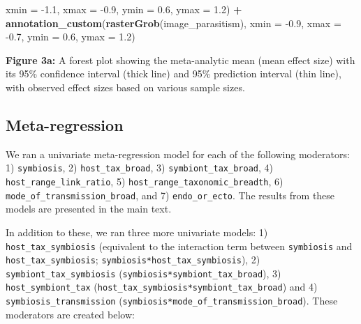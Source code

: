\documentclass[
]{article}
\newenvironment{Shaded}{\begin{snugshade}}{\end{snugshade}}
\newcommand{\DataTypeTok}[1]{\textcolor[rgb]{0.13,0.29,0.53}{#1}}
\newcommand{\FloatTok}[1]{\textcolor[rgb]{0.00,0.00,0.81}{#1}}
\newcommand{\KeywordTok}[1]{\textcolor[rgb]{0.13,0.29,0.53}{\textbf{#1}}}
\newcommand{\NormalTok}[1]{#1}
\newcommand{\OperatorTok}[1]{\textcolor[rgb]{0.81,0.36,0.00}{\textbf{#1}}}
\newcommand{\StringTok}[1]{\textcolor[rgb]{0.31,0.60,0.02}{#1}}
\begin{document}
\begin{Shaded}
\begin{Highlighting}[]
    \DataTypeTok{xmin =} \FloatTok{-1.1}\NormalTok{, }\DataTypeTok{xmax =} \FloatTok{-0.9}\NormalTok{, }\DataTypeTok{ymin =} \FloatTok{0.6}\NormalTok{, }\DataTypeTok{ymax =} \FloatTok{1.2}\NormalTok{) }\OperatorTok{+}\StringTok{ }\KeywordTok{annotation_custom}\NormalTok{(}\KeywordTok{rasterGrob}\NormalTok{(image_parasitism), }
    \DataTypeTok{xmin =} \FloatTok{-0.9}\NormalTok{, }\DataTypeTok{xmax =} \FloatTok{-0.7}\NormalTok{, }\DataTypeTok{ymin =} \FloatTok{0.6}\NormalTok{, }\DataTypeTok{ymax =} \FloatTok{1.2}\NormalTok{)}
\end{Highlighting}
\end{Shaded}

\textbf{Figure 3a:} A forest plot showing the meta-analytic mean (mean
effect size) with its 95\% confidence interval (thick line) and 95\%
prediction interval (thin line), with observed effect sizes based on
various sample sizes.

\hypertarget{meta-regression}{%
\subsection{Meta-regression}\label{meta-regression}}

We ran a univariate meta-regression model for each of the following
moderators: 1) \texttt{symbiosis}, 2) \texttt{host\_tax\_broad}, 3)
\texttt{symbiont\_tax\_broad}, 4) \texttt{host\_range\_link\_ratio}, 5)
\texttt{host\_range\_taxonomic\_breadth}, 6)
\texttt{mode\_of\_transmission\_broad}, and 7) \texttt{endo\_or\_ecto}.
The results from these models are presented in the main text.

In addition to these, we ran three more univariate models: 1)
\texttt{host\_tax\_symbiosis} (equivalent to the interaction term
between \texttt{symbiosis} and \texttt{host\_tax\_symbiosis};
\texttt{symbiosis*host\_tax\_symbiosis}), 2)
\texttt{symbiont\_tax\_symbiosis}
(\texttt{symbiosis*symbiont\_tax\_broad}), 3)
\texttt{host\_symbiont\_tax}
(\texttt{host\_tax\_symbiosis*symbiont\_tax\_broad}) and 4)
\texttt{symbiosis\_transmission}
(\texttt{symbiosis*mode\_of\_transmission\_broad}). These moderators are
created below:
\end{document}
